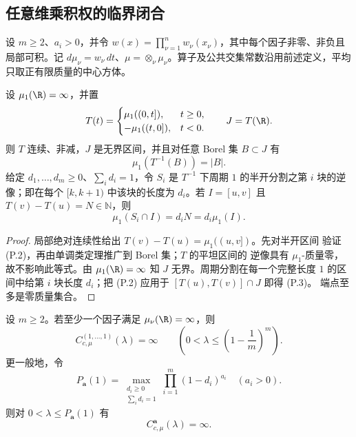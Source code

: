 \subsection{任意维乘积权的临界闭合}
设 $m\ge2$、$a_i>0$，并令 $w(x)=\prod_{\nu=1}^n w_\nu(x_\nu)$，其中每个因子非零、非负且局部可积。记 $d\mu_\nu=w_\nu\,dt$、$\mu=\otimes_\nu\mu_\nu$。算子及公共交集常数沿用前述定义，平均只取正有限质量的中心方体。
\begin{lemma}[累计质量坐标的整数周期恒等式]\label{lem:periodic}
设 $\mu_1(\R)=\infty$，并置
\[
 T(t)=\begin{cases}\mu_1((0,t]),&t\geq0,\\-\mu_1((t,0]),&t<0.\end{cases}
 \qquad J=T(\R).
\]
则 $T$ 连续、非减，$J$ 是无界区间，并且对任意 Borel 集
$B\subset J$ 有
\[
 \mu_1(T^{-1}(B))=|B|. \tag{P.2}
\]
给定 $d_1,\ldots,d_m\geq0$、$\sum_i d_i=1$，令 $S_i$ 是
$T^{-1}$ 下周期 $1$ 的半开分割之第 $i$ 块的逆像；即在每个
$[k,k+1)$ 中该块的长度为 $d_i$。若 $I=[u,v]$ 且
$T(v)-T(u)=N\in\mathbb N$，则
\[
 \mu_1(S_i\cap I)=d_iN=d_i\mu_1(I). \tag{P.3}
\]
\end{lemma}

\begin{proof}
局部绝对连续性给出 $T(v)-T(u)=\mu_1((u,v])$。先对半开区间
验证 (P.2)，再由单调类定理推广到 Borel 集；$T$ 的平坦区间的
逆像具有 $\mu_1$-质量零，故不影响此等式。由 $\mu_1(\R)=\infty$
知 $J$ 无界。周期分割在每一个完整长度 $1$ 的区间中给第 $i$
块长度 $d_i$；把 (P.2) 应用于 $[T(u),T(v)]\cap J$ 即得 (P.3)。
端点至多是零质量集合。
\end{proof}

\begin{theorem}[有无限因子的乘积权临界定理]\label{thm:product-critical}
设 $m\ge2$。若至少一个因子满足 $\mu_\nu(\R)=\infty$，则
\[
 C_{c,\mu}^{(1,\ldots,1)}(\lambda)=\infty
 \qquad\left(0<\lambda\leq\left(1-\frac1m\right)^m\right). \tag{P.4}
\]
更一般地，令
\[
 P_{\boldsymbol a}(1)=
 \max_{\substack{d_i\ge0\\\sum_i d_i=1}}
 \prod_{i=1}^m(1-d_i)^{a_i} \quad(a_i>0).
 \tag{P.5}
\]
则对 $0<\lambda\le P_{\boldsymbol a}(1)$ 有
\[
 C_{c,\mu}^{\boldsymbol a}(\lambda)=\infty. \tag{P.6}
\]
\end{theorem}

